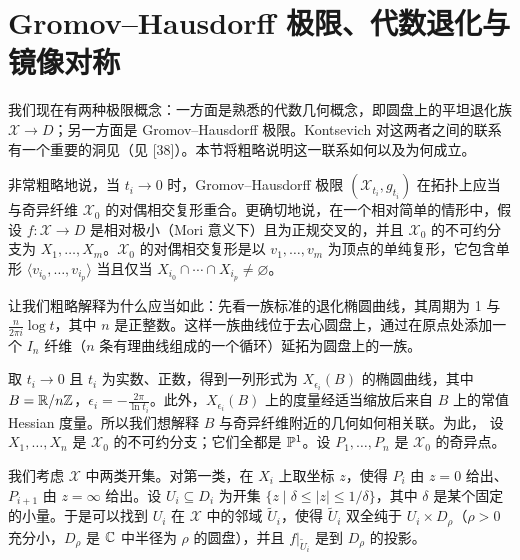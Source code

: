 
\section{Gromov--Hausdorff 极限、代数退化与镜像对称}

我们现在有两种极限概念：一方面是熟悉的代数几何概念，即圆盘上的平坦退化族 $\mathcal{X}\to D$；另一方面是 Gromov--Hausdorff 极限。Kontsevich 对这两者之间的联系有一个重要的洞见（见 [38]）。本节将粗略说明这一联系如何以及为何成立。

非常粗略地说，当 $t_i\to0$ 时，Gromov--Hausdorff 极限 $(\mathcal{X}_{t_i},g_{t_i})$ 在拓扑上应当与奇异纤维 $\mathcal{X}_0$ 的对偶相交复形重合。更确切地说，在一个相对简单的情形中，假设 $f:\mathcal{X}\to D$ 是相对极小（Mori 意义下）且为正规交叉的，并且 $\mathcal{X}_0$ 的不可约分支为 $X_1,\dots,X_m$。$\mathcal{X}_0$ 的对偶相交复形是以 $v_1,\dots,v_m$ 为顶点的单纯复形，它包含单形 $\langle v_{i_0},\dots,v_{i_p}\rangle$ 当且仅当 $X_{i_0}\cap\cdots\cap X_{i_p}\ne\varnothing$。

让我们粗略解释为什么应当如此：先看一族标准的退化椭圆曲线，其周期为 1 与 $\frac{n}{2\pi i}\log t$，其中 $n$ 是正整数。这样一族曲线位于去心圆盘上，通过在原点处添加一个 $I_n$ 纤维（$n$ 条有理曲线组成的一个循环）延拓为圆盘上的一族。


取 $t_i\to0$ 且 $t_i$ 为实数、正数，得到一列形式为 $X_{\epsilon_i}(B)$ 的椭圆曲线，其中 $B=\mathbb{R}/n\mathbb{Z}$，$\epsilon_i=-\frac{2\pi}{\ln t_i}$。此外，$X_{\epsilon_i}(B)$ 上的度量经适当缩放后来自 $B$ 上的常值 Hessian 度量。所以我们想解释 $B$ 与奇异纤维附近的几何如何相关联。为此，
设 $X_1,\dots,X_n$ 是 $\mathcal{X}_0$ 的不可约分支；它们全都是 $\mathbb{P}^1$。设 $P_1,\dots,P_n$ 是 $\mathcal{X}_0$ 的奇异点。

我们考虑 $\mathcal{X}$ 中两类开集。对第一类，在 $X_i$ 上取坐标 $z$，使得 $P_i$ 由 $z=0$ 给出、$P_{i+1}$ 由 $z=\infty$ 给出。设 $U_i\subseteq D_i$ 为开集 $\{z\mid\delta\le|z|\le1/\delta\}$，其中 $\delta$ 是某个固定的小量。于是可以找到 $U_i$ 在 $\mathcal{X}$ 中的邻域 $\tilde U_i$，使得 $\tilde U_i$ 双全纯于 $U_i\times D_\rho$（$\rho>0$ 充分小，$D_\rho$ 是 $\mathbb{C}$ 中半径为 $\rho$ 的圆盘），并且 $f|_{\tilde U_i}$ 是到 $D_\rho$ 的投影。

